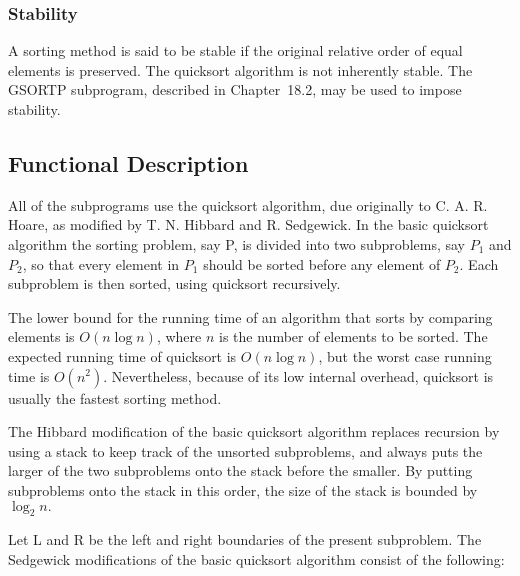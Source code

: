 \documentclass[twoside]{MATH77}
\begin{document}
\subsubsection{Stability}

A sorting method is said to be stable if the original relative order of
equal elements is preserved. The quicksort algorithm is not inherently
stable. The GSORTP subprogram, described in Chapter~18.2, may be used to
impose stability.

\subsection{Functional Description}

All of the subprograms use the quicksort algorithm, due originally to C. A.
R. Hoare, as modified by T. N. Hibbard and R. Sedgewick. In the basic
quicksort algorithm the sorting problem, say P, is divided into two
subproblems, say $P_1$ and $P_2$, so that every element in $P_1$ should be
sorted before any element of $P_2$. Each subproblem is then sorted, using
quicksort recursively.

The lower bound for the running time of an algorithm that sorts by comparing
elements is $O(n \log n)$, where $n$ is the number of elements to be
sorted. The expected running time of quicksort is $O(n \log  n)$, but the
worst case running time is $O(n^2)$. Nevertheless, because of its low
internal overhead, quicksort is usually the fastest sorting method.

The Hibbard modification of the basic quicksort algorithm replaces recursion
by using a stack to keep track of the unsorted subproblems, and always puts
the larger of the two subproblems onto the stack before the smaller. By
putting subproblems onto the stack in this order, the size of the stack is
bounded by $\log _2 n.$

Let L and R be the left and right boundaries of the present subproblem. The
Sedgewick modifications of the basic quicksort algorithm consist of the
following:
\end{document}
